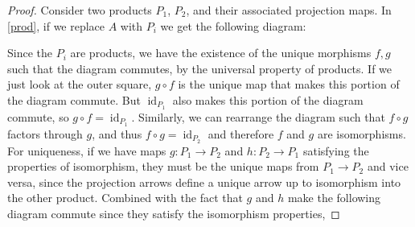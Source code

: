 \begin{proof}
    Consider two products $P_1$, $P_2$, and their associated projection maps. In \cref{prod}, if we replace $A$ with $P_i $ we get the following diagram:
\begin{figure}[H]
\centering
{}
\end{figure} Since the $P_i $ are products, we have the existence of the unique morphisms $f,g$ such that the diagram commutes, by the universal property of products. If we just look at the outer square, $g\circ f$ is the unique map that makes this portion of the diagram commute. But $\operatorname{id}_{P_1}$ also makes this portion of the diagram commute, so $g\circ f=\operatorname{id}_{P_1}$. Similarly, we can rearrange the diagram such that $f\circ g$ factors through $g$, and thus $f\circ g=\operatorname{id}_{P_2}$ and therefore $f$ and $g$ are isomorphisms. For uniqueness, if we have maps $g \colon P_1 \to P_2$ and $h \colon P_2 \to P_1$ satisfying the properties of isomorphism, they must be the unique maps from $P_1\to P_2$ and vice versa, since the projection arrows define a unique arrow up to isomorphism into the other product. Combined with the fact that $g$ and $h$ make the following diagram commute since they satisfy the isomorphism properties,

\end{proof}
